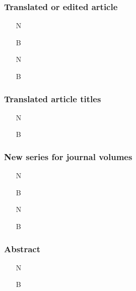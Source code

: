 \documentclass[11pt,letterpaper,oneside]{article}
\begin{document}
\subsubsection{Translated or edited article}
\label{14.192}

\begin{itemize}
\item[N] 

\item[B] 

\item[N] 

\item[B] 
\end{itemize}

\setcounter{subsubsection}{193}
\subsubsection{Translated article titles}

\begin{itemize}
\item[N] 

\item[B] 
\end{itemize}

\setcounter{subsubsection}{194}
\subsubsection{New series for journal volumes}
\label{14.195}

\begin{itemize}
\item[N] 

\item[B] 

\item[N] 

\item[B] 
\end{itemize}

\setcounter{subsubsection}{196}
\subsubsection{Abstract}

\begin{itemize}
\item[N] 

\item[B] 
\end{itemize}
\end{document}
